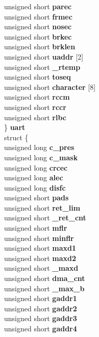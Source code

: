 \begin{DoxyCompactItemize}
\begin{tabbing}
\>\>unsigned short {\bfseries parec}\\
\>\>unsigned short {\bfseries frmec}\\
\>\>unsigned short {\bfseries nosec}\\
\>\>unsigned short {\bfseries brkec}\\
\>\>unsigned short {\bfseries brklen}\\
\>\>unsigned short {\bfseries uaddr} \mbox{[}2\mbox{]}\\
\>\>unsigned short {\bfseries \_rtemp}\\
\>\>unsigned short {\bfseries toseq}\\
\>\>unsigned short {\bfseries character} \mbox{[}8\mbox{]}\\
\>\>unsigned short {\bfseries rccm}\\
\>\>unsigned short {\bfseries rccr}\\
\>\>unsigned short {\bfseries rlbc}\\
\>\} {\bfseries uart}\\
\>struct \{\\
\>\>unsigned long {\bfseries c\_pres}\\
\>\>unsigned long {\bfseries c\_mask}\\
\>\>unsigned long {\bfseries crcec}\\
\>\>unsigned long {\bfseries alec}\\
\>\>unsigned long {\bfseries disfc}\\
\>\>unsigned short {\bfseries pads}\\
\>\>unsigned short {\bfseries ret\_lim}\\
\>\>unsigned short {\bfseries \_ret\_cnt}\\
\>\>unsigned short {\bfseries mflr}\\
\>\>unsigned short {\bfseries minflr}\\
\>\>unsigned short {\bfseries maxd1}\\
\>\>unsigned short {\bfseries maxd2}\\
\>\>unsigned short {\bfseries \_maxd}\\
\>\>unsigned short {\bfseries dma\_cnt}\\
\>\>unsigned short {\bfseries \_max\_b}\\
\>\>unsigned short {\bfseries gaddr1}\\
\>\>unsigned short {\bfseries gaddr2}\\
\>\>unsigned short {\bfseries gaddr3}\\
\>\>unsigned short {\bfseries gaddr4}\\

\end{tabbing}
\end{DoxyCompactItemize}
